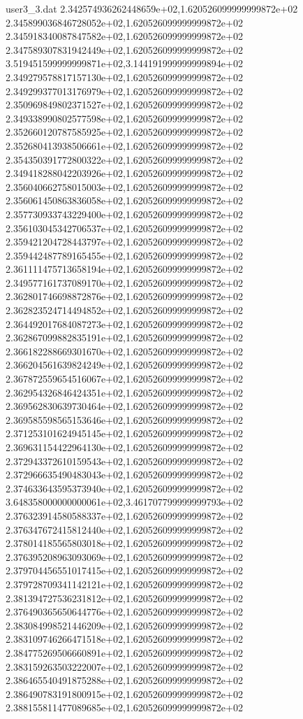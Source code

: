 \begin{filecontents}{user3_3.dat}
2.342574936262448659e+02,1.620526099999999872e+02
2.345899036846728052e+02,1.620526099999999872e+02
2.345918340087847582e+02,1.620526099999999872e+02
2.347589307831942449e+02,1.620526099999999872e+02
3.519451599999999871e+02,3.144191999999999894e+02
2.349279578817157130e+02,1.620526099999999872e+02
2.349299377013176979e+02,1.620526099999999872e+02
2.350969849802371527e+02,1.620526099999999872e+02
2.349338990802577598e+02,1.620526099999999872e+02
2.352660120787585925e+02,1.620526099999999872e+02
2.352680413938506661e+02,1.620526099999999872e+02
2.354350391772800322e+02,1.620526099999999872e+02
2.349418288042203926e+02,1.620526099999999872e+02
2.356040662758015003e+02,1.620526099999999872e+02
2.356061450863836058e+02,1.620526099999999872e+02
2.357730933743229400e+02,1.620526099999999872e+02
2.356103045342706537e+02,1.620526099999999872e+02
2.359421204728443797e+02,1.620526099999999872e+02
2.359442487789165455e+02,1.620526099999999872e+02
2.361111475713658194e+02,1.620526099999999872e+02
2.349577161737089170e+02,1.620526099999999872e+02
2.362801746698872876e+02,1.620526099999999872e+02
2.362823524714494852e+02,1.620526099999999872e+02
2.364492017684087273e+02,1.620526099999999872e+02
2.362867099882835191e+02,1.620526099999999872e+02
2.366182288669301670e+02,1.620526099999999872e+02
2.366204561639824249e+02,1.620526099999999872e+02
2.367872559654516067e+02,1.620526099999999872e+02
2.362954326846424351e+02,1.620526099999999872e+02
2.369562830639730464e+02,1.620526099999999872e+02
2.369585598565153646e+02,1.620526099999999872e+02
2.371253101624945145e+02,1.620526099999999872e+02
2.369631154422964130e+02,1.620526099999999872e+02
2.372943372610159543e+02,1.620526099999999872e+02
2.372966635490483043e+02,1.620526099999999872e+02
2.374633643595373940e+02,1.620526099999999872e+02
3.648358000000000061e+02,3.461707799999999793e+02
2.376323914580588337e+02,1.620526099999999872e+02
2.376347672415812440e+02,1.620526099999999872e+02
2.378014185565803018e+02,1.620526099999999872e+02
2.376395208963093069e+02,1.620526099999999872e+02
2.379704456551017415e+02,1.620526099999999872e+02
2.379728709341142121e+02,1.620526099999999872e+02
2.381394727536231812e+02,1.620526099999999872e+02
2.376490365650644776e+02,1.620526099999999872e+02
2.383084998521446209e+02,1.620526099999999872e+02
2.383109746266471518e+02,1.620526099999999872e+02
2.384775269506660891e+02,1.620526099999999872e+02
2.383159263503222007e+02,1.620526099999999872e+02
2.386465540491875288e+02,1.620526099999999872e+02
2.386490783191800915e+02,1.620526099999999872e+02
2.388155811477089685e+02,1.620526099999999872e+02

\end{filecontents}
